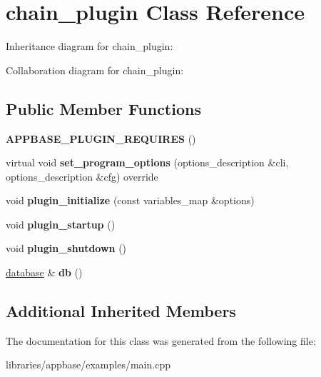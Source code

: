 \hypertarget{classchain__plugin}{}\section{chain\+\_\+plugin Class Reference}
\label{classchain__plugin}


Inheritance diagram for chain\+\_\+plugin\+:


Collaboration diagram for chain\+\_\+plugin\+:
\subsection*{Public Member Functions}
\begin{DoxyCompactItemize}
\item 
\mbox{\label{classchain__plugin_a3df251841b594a6e555f40f3caa6a986}} 
{\bfseries A\+P\+P\+B\+A\+S\+E\+\_\+\+P\+L\+U\+G\+I\+N\+\_\+\+R\+E\+Q\+U\+I\+R\+ES} ()
\item 
\mbox{\label{classchain__plugin_a23f5f088e302e535ccf74747ec7993d4}} 
virtual void {\bfseries set\+\_\+program\+\_\+options} (options\+\_\+description \&cli, options\+\_\+description \&cfg) override
\item 
\mbox{\label{classchain__plugin_a0192ac61f3f59d4fdf2dcbbd2c7104ca}} 
void {\bfseries plugin\+\_\+initialize} (const variables\+\_\+map \&options)
\item 
\mbox{\label{classchain__plugin_affe5ea83d9db4d721af39fd7568c5875}} 
void {\bfseries plugin\+\_\+startup} ()
\item 
\mbox{\label{classchain__plugin_a3ed4600a8200efd4cbad0e547a3ffbde}} 
void {\bfseries plugin\+\_\+shutdown} ()
\item 
\mbox{\label{classchain__plugin_a4421a962277da30a4ac98e1f2a4928c8}} 
\mbox{\hyperlink{structdatabase}{database}} \& {\bfseries db} ()
\end{DoxyCompactItemize}
\subsection*{Additional Inherited Members}


The documentation for this class was generated from the following file\+:\begin{DoxyCompactItemize}
\item 
libraries/appbase/examples/main.\+cpp\end{DoxyCompactItemize}

